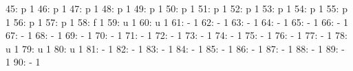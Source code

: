 \documentclass[nojss]{jss}
\begin{document}
\begin{Schunk}
\begin{Soutput}
 45:                               p                   1
 46:                               p                   1
 47:                               p                   1
 48:                               p                   1
 49:                               p                   1
 50:                               p                   1
 51:                               p                   1
 52:                               p                   1
 53:                               p                   1
 54:                               p                   1
 55:                               p                   1
 56:                               p                   1
 57:                               p                   1
 58:                               f                   1
 59:                               u                   1
 60:                               u                   1
 61:                               -                   1
 62:                               -                   1
 63:                               -                   1
 64:                               -                   1
 65:                               -                   1
 66:                               -                   1
 67:                               -                   1
 68:                               -                   1
 69:                               -                   1
 70:                               -                   1
 71:                               -                   1
 72:                               -                   1
 73:                               -                   1
 74:                               -                   1
 75:                               -                   1
 76:                               -                   1
 77:                               -                   1
 78:                               u                   1
 79:                               u                   1
 80:                               u                   1
 81:                               -                   1
 82:                               -                   1
 83:                               -                   1
 84:                               -                   1
 85:                               -                   1
 86:                               -                   1
 87:                               -                   1
 88:                               -                   1
 89:                               -                   1
 90:                               -                   1

\end{Soutput}
\end{Schunk}
\end{document}
